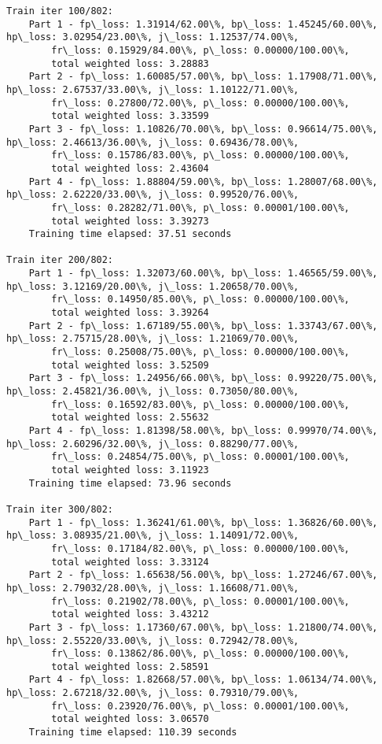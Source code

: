 \documentclass[11pt]{article}
\begin{document}
\begin{Verbatim}[commandchars=\\\{\}]
Train iter 100/802:
	Part 1 - fp\_loss: 1.31914/62.00\%, bp\_loss: 1.45245/60.00\%, hp\_loss: 3.02954/23.00\%, j\_loss: 1.12537/74.00\%, 
		fr\_loss: 0.15929/84.00\%, p\_loss: 0.00000/100.00\%, 
		total weighted loss: 3.28883
	Part 2 - fp\_loss: 1.60085/57.00\%, bp\_loss: 1.17908/71.00\%, hp\_loss: 2.67537/33.00\%, j\_loss: 1.10122/71.00\%, 
		fr\_loss: 0.27800/72.00\%, p\_loss: 0.00000/100.00\%, 
		total weighted loss: 3.33599
	Part 3 - fp\_loss: 1.10826/70.00\%, bp\_loss: 0.96614/75.00\%, hp\_loss: 2.46613/36.00\%, j\_loss: 0.69436/78.00\%, 
		fr\_loss: 0.15786/83.00\%, p\_loss: 0.00000/100.00\%, 
		total weighted loss: 2.43604
	Part 4 - fp\_loss: 1.88804/59.00\%, bp\_loss: 1.28007/68.00\%, hp\_loss: 2.62220/33.00\%, j\_loss: 0.99520/76.00\%, 
		fr\_loss: 0.28282/71.00\%, p\_loss: 0.00001/100.00\%, 
		total weighted loss: 3.39273
	Training time elapsed: 37.51 seconds

Train iter 200/802:
	Part 1 - fp\_loss: 1.32073/60.00\%, bp\_loss: 1.46565/59.00\%, hp\_loss: 3.12169/20.00\%, j\_loss: 1.20658/70.00\%, 
		fr\_loss: 0.14950/85.00\%, p\_loss: 0.00000/100.00\%, 
		total weighted loss: 3.39264
	Part 2 - fp\_loss: 1.67189/55.00\%, bp\_loss: 1.33743/67.00\%, hp\_loss: 2.75715/28.00\%, j\_loss: 1.21069/70.00\%, 
		fr\_loss: 0.25008/75.00\%, p\_loss: 0.00000/100.00\%, 
		total weighted loss: 3.52509
	Part 3 - fp\_loss: 1.24956/66.00\%, bp\_loss: 0.99220/75.00\%, hp\_loss: 2.45821/36.00\%, j\_loss: 0.73050/80.00\%, 
		fr\_loss: 0.16592/83.00\%, p\_loss: 0.00000/100.00\%, 
		total weighted loss: 2.55632
	Part 4 - fp\_loss: 1.81398/58.00\%, bp\_loss: 0.99970/74.00\%, hp\_loss: 2.60296/32.00\%, j\_loss: 0.88290/77.00\%, 
		fr\_loss: 0.24854/75.00\%, p\_loss: 0.00001/100.00\%, 
		total weighted loss: 3.11923
	Training time elapsed: 73.96 seconds

Train iter 300/802:
	Part 1 - fp\_loss: 1.36241/61.00\%, bp\_loss: 1.36826/60.00\%, hp\_loss: 3.08935/21.00\%, j\_loss: 1.14091/72.00\%, 
		fr\_loss: 0.17184/82.00\%, p\_loss: 0.00000/100.00\%, 
		total weighted loss: 3.33124
	Part 2 - fp\_loss: 1.65638/56.00\%, bp\_loss: 1.27246/67.00\%, hp\_loss: 2.79032/28.00\%, j\_loss: 1.16608/71.00\%, 
		fr\_loss: 0.21902/78.00\%, p\_loss: 0.00001/100.00\%, 
		total weighted loss: 3.43212
	Part 3 - fp\_loss: 1.17360/67.00\%, bp\_loss: 1.21800/74.00\%, hp\_loss: 2.55220/33.00\%, j\_loss: 0.72942/78.00\%, 
		fr\_loss: 0.13862/86.00\%, p\_loss: 0.00000/100.00\%, 
		total weighted loss: 2.58591
	Part 4 - fp\_loss: 1.82668/57.00\%, bp\_loss: 1.06134/74.00\%, hp\_loss: 2.67218/32.00\%, j\_loss: 0.79310/79.00\%, 
		fr\_loss: 0.23920/76.00\%, p\_loss: 0.00001/100.00\%, 
		total weighted loss: 3.06570
	Training time elapsed: 110.39 seconds


\end{Verbatim}
\end{document}
